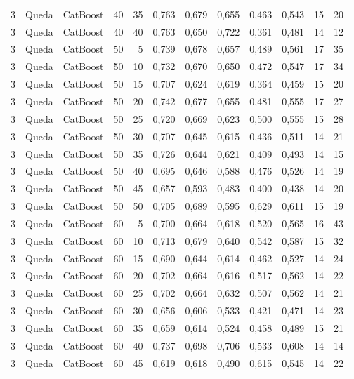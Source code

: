 \begin{longtable}{@{}rllrrrrrrrrr@{}}
3 & Queda & CatBoost & 40 & 35 & 0,763 & 0,679 & 0,655 & 0,463 & 0,543 & 15 & 20 \\
3 & Queda & CatBoost & 40 & 40 & 0,763 & 0,650 & 0,722 & 0,361 & 0,481 & 14 & 12 \\
3 & Queda & CatBoost & 50 & 5 & 0,739 & 0,678 & 0,657 & 0,489 & 0,561 & 17 & 35 \\
3 & Queda & CatBoost & 50 & 10 & 0,732 & 0,670 & 0,650 & 0,472 & 0,547 & 17 & 34 \\
3 & Queda & CatBoost & 50 & 15 & 0,707 & 0,624 & 0,619 & 0,364 & 0,459 & 15 & 20 \\
3 & Queda & CatBoost & 50 & 20 & 0,742 & 0,677 & 0,655 & 0,481 & 0,555 & 17 & 27 \\
3 & Queda & CatBoost & 50 & 25 & 0,720 & 0,669 & 0,623 & 0,500 & 0,555 & 15 & 28 \\
3 & Queda & CatBoost & 50 & 30 & 0,707 & 0,645 & 0,615 & 0,436 & 0,511 & 14 & 21 \\
3 & Queda & CatBoost & 50 & 35 & 0,726 & 0,644 & 0,621 & 0,409 & 0,493 & 14 & 15 \\
3 & Queda & CatBoost & 50 & 40 & 0,695 & 0,646 & 0,588 & 0,476 & 0,526 & 14 & 19 \\
3 & Queda & CatBoost & 50 & 45 & 0,657 & 0,593 & 0,483 & 0,400 & 0,438 & 14 & 20 \\
3 & Queda & CatBoost & 50 & 50 & 0,705 & 0,689 & 0,595 & 0,629 & 0,611 & 15 & 19 \\
3 & Queda & CatBoost & 60 & 5 & 0,700 & 0,664 & 0,618 & 0,520 & 0,565 & 16 & 43 \\
3 & Queda & CatBoost & 60 & 10 & 0,713 & 0,679 & 0,640 & 0,542 & 0,587 & 15 & 32 \\
3 & Queda & CatBoost & 60 & 15 & 0,690 & 0,644 & 0,614 & 0,462 & 0,527 & 14 & 24 \\
3 & Queda & CatBoost & 60 & 20 & 0,702 & 0,664 & 0,616 & 0,517 & 0,562 & 14 & 22 \\
3 & Queda & CatBoost & 60 & 25 & 0,702 & 0,664 & 0,632 & 0,507 & 0,562 & 14 & 21 \\
3 & Queda & CatBoost & 60 & 30 & 0,656 & 0,606 & 0,533 & 0,421 & 0,471 & 14 & 23 \\
3 & Queda & CatBoost & 60 & 35 & 0,659 & 0,614 & 0,524 & 0,458 & 0,489 & 15 & 21 \\
3 & Queda & CatBoost & 60 & 40 & 0,737 & 0,698 & 0,706 & 0,533 & 0,608 & 14 & 14 \\
3 & Queda & CatBoost & 60 & 45 & 0,619 & 0,618 & 0,490 & 0,615 & 0,545 & 14 & 22 \\

\end{longtable}
